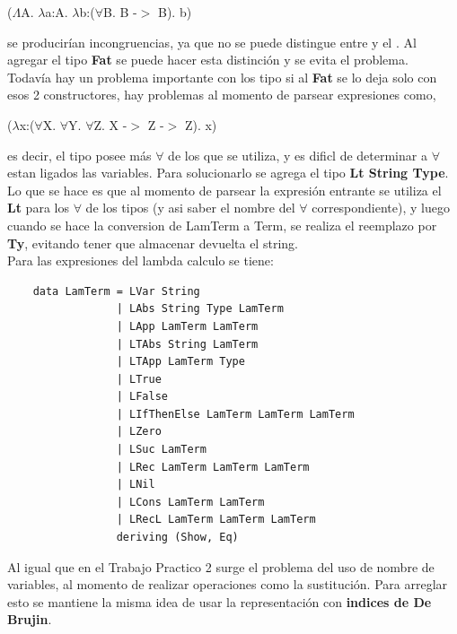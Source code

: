 \documentclass[12pt, titlepage, a4paper]{article}
\begin{document}
  \begin{center}
    ($\Lambda$A. $\lambda$a:A. $\lambda$b:($\forall$B. B -$>$ B). b)
  \end{center}  
  se producirían incongruencias, ya que no se puede distingue entre \say{$\Lambda$} y el \say{$\forall$}. Al agregar el tipo \textbf{Fat} se puede 
  hacer esta distinción  y se evita el problema.\\

  Todavía hay un problema importante con los tipo si al \textbf{Fat} se lo deja solo con esos 2 constructores, hay problemas al momento de parsear 
  expresiones como,

  \begin{center}
    ($\lambda$x:($\forall$X. $\forall$Y. $\forall$Z. X -$>$ Z -$>$ Z). x)
  \end{center}  
  es decir, el tipo posee más $\forall$ de los que se utiliza, y es dificl de determinar a $\forall$ estan ligados las variables. 
  Para solucionarlo se agrega el tipo \textbf{Lt String Type}. \\
  
  Lo que se hace es que 
  al momento de parsear la expresión entrante se utiliza el \textbf{Lt} para los $\forall$ de los tipos (y asi saber el nombre del $\forall$
  correspondiente), y luego cuando se hace la conversion de 
  LamTerm a Term, se realiza el reemplazo por \textbf{Ty}, evitando tener que almacenar devuelta el string.\\


\noindent Para las expresiones del lambda calculo se tiene:
\begin{verbatim}
    data LamTerm = LVar String
                 | LAbs String Type LamTerm
                 | LApp LamTerm LamTerm
                 | LTAbs String LamTerm
                 | LTApp LamTerm Type
                 | LTrue 
                 | LFalse
                 | LIfThenElse LamTerm LamTerm LamTerm
                 | LZero
                 | LSuc LamTerm
                 | LRec LamTerm LamTerm LamTerm
                 | LNil
                 | LCons LamTerm LamTerm
                 | LRecL LamTerm LamTerm LamTerm
                 deriving (Show, Eq)
\end{verbatim}

Al igual que en el Trabajo Practico 2 \cite{tp2:lambdaCalculoSimpleTipado} surge el problema del uso de nombre de variables, al 
momento de realizar operaciones como la sustitución. Para arreglar esto se mantiene la misma idea de 
usar la representación con \textbf{indices de De Brujin}. \\
\end{document}
